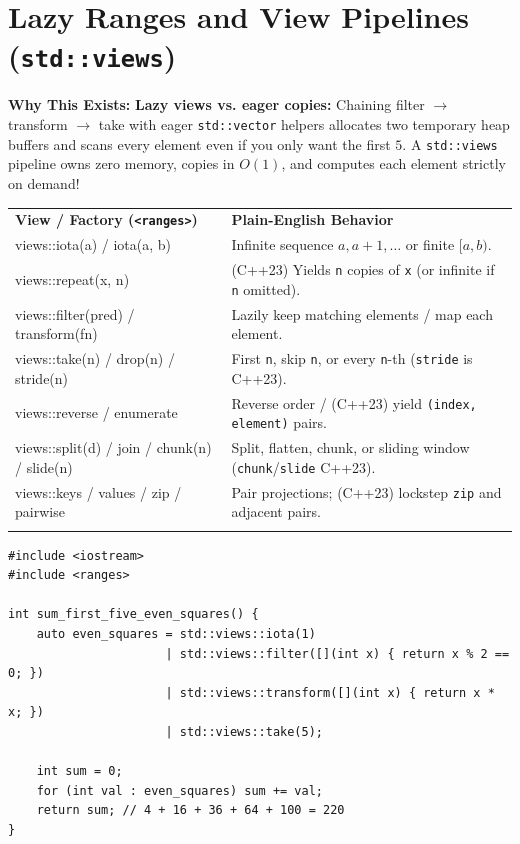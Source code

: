\documentclass[11pt,a4paper]{article}
\newcommand{\whybeat}{\textbf{\color{accentteal}Why This Exists:} }
\begin{document}
\section{Lazy Ranges and View Pipelines (\texttt{std::views})}

\whybeat \textbf{Lazy views vs. eager copies:} Chaining filter $\to$ transform $\to$ take with eager \texttt{std::vector} helpers allocates two temporary heap buffers and scans every element even if you only want the first $5$. A \texttt{std::views} pipeline owns zero memory, copies in $O(1)$, and computes each element strictly on demand!

\begingroup\footnotesize{}
\begin{tabularx}{\textwidth}{>{\raggedright\arraybackslash\ttfamily}p{4.3cm} >{\raggedright\arraybackslash}X}
\arrayrulecolor{primaryblue}\toprule[1.1pt]
\rowcolor{primaryblue!10}
\textcolor{primaryblue}{\normalfont\bfseries View / Factory (\texttt{<ranges>})} & \textcolor{primaryblue}{\textbf{Plain-English Behavior}} \\
\arrayrulecolor{codeframe}\midrule[0.6pt]
views::iota(a) / iota(a, b) & Infinite sequence $a, a+1, \dots$ or finite $[a, b)$. \\
views::repeat(x, n) & (C++23) Yields \texttt{n} copies of \texttt{x} (or infinite if \texttt{n} omitted). \\
views::filter(pred) / transform(fn) & Lazily keep matching elements / map each element. \\
views::take(n) / drop(n) / stride(n) & First \texttt{n}, skip \texttt{n}, or every \texttt{n}-th (\texttt{stride} is C++23). \\
views::reverse / enumerate & Reverse order / (C++23) yield \texttt{(index, element)} pairs. \\
views::split(d) / join / chunk(n) / slide(n) & Split, flatten, chunk, or sliding window (\texttt{chunk}/\texttt{slide} C++23). \\
views::keys / values / zip / pairwise & Pair projections; (C++23) lockstep \texttt{zip} and adjacent pairs. \\
\arrayrulecolor{primaryblue}\bottomrule[1.1pt]
\end{tabularx}\endgroup

\begin{lstlisting}[caption={Lazy pipe composition with \texttt{std::views} (zero intermediate allocations)}]
#include <iostream>
#include <ranges>

int sum_first_five_even_squares() {
    auto even_squares = std::views::iota(1)
                      | std::views::filter([](int x) { return x % 2 == 0; })
                      | std::views::transform([](int x) { return x * x; })
                      | std::views::take(5);

    int sum = 0;
    for (int val : even_squares) sum += val;
    return sum; // 4 + 16 + 36 + 64 + 100 = 220
}
\end{lstlisting}
\end{document}
